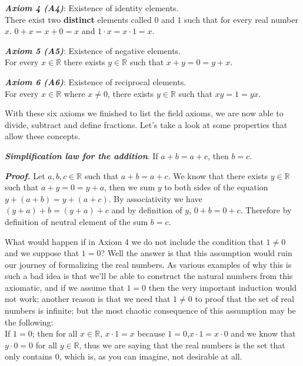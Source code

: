 \documentclass{report}
\begin{document}
    \begin{axBox}
        \textit{\textbf{Axiom 4 (A4)}}: Existence of identity elements.\\
        There exist two \textbf{distinct} elements called $0$ and $1$ such that for every real number $x$. $0+x=x+0=x$ and $1 \cdot x = x \cdot 1 = x$.
    \end{axBox}

    \begin{axBox}
        \textit{\textbf{Axiom 5 (A5)}}: Existence of negative elements.\\
        For every $x \in \mathbb{R}$ there exists $y \in \mathbb{R}$ such that $x+y = 0= y+x$.
    \end{axBox}

    \begin{axBox}
        \textit{\textbf{Axiom 6 (A6)}}: Existence of reciprocal elements.\\
        For every $x\in \mathbb{R}$ where $x \not = 0$, there exists $y \in \mathbb{R}$ such that $xy=1=yx$.
    \end{axBox}

    With these six axioms we finished to list the field axioms, we are now able to divide, subtract and define fractions. Let's take a look at some properties that allow these concepts.

    \begin{thBox}
        \textit{\textbf{Simplification law for the addition}}. If $a+b=a+c$, then $b=c$.
    \end{thBox}

    \textit{\textbf{Proof.}} Let $a,b,c \in \mathbb{R}$ such that $a+b=a+c$. We know that there exists $y \in \mathbb{R}$ such that $a+y = 0 = y+a$, then we sum $y$ to both sides of the equation $y+(a+b)=y+(a+c)$. By associativity we have $(y+a)+b=(y+a)+c$ and by definition of $y$, $0+b=0+c$. Therefore by definition of neutral element of the sum $b=c$.

    \begin{asideBox}
        What would happen if in Axiom 4 we do not include the condition that $1 \not = 0$ and we suppose that $1=0$? Well the answer is that this assumption would ruin our journey of formalizing the real numbers. As various examples of why this is such a bad idea is that we'll be able to construct the natural numbers from this axiomatic, and if we assume that $1=0$ then the very important induction would not work; another reason is that we need that $1 \not = 0$ to proof that the set of real numbers is infinite; but the most chaotic consequence of this assumption may be the following:\\

        If $1=0$; then for all $x \in \mathbb{R}$, $x\cdot 1 = x$ because $1 = 0$,$x \cdot 1 = x \cdot 0$ and we know that $y \cdot 0 = 0$ for all $y\in \mathbb{R}$, thus we are saying that the real numbers is the set that only contains $0$, which is, as you can imagine, not desirable at all.
    \end{asideBox}
\end{document}

